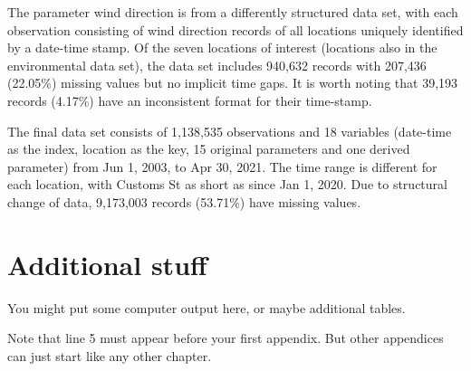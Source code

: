 \documentclass{aucklandthesis}
\begin{document}
The parameter wind direction is from a differently structured data set, with each observation consisting of wind direction records of all locations uniquely identified by a date-time stamp. Of the seven locations of interest (locations also in the environmental data set), the data set includes 940,632 records with 207,436 (22.05\%) missing values but no implicit time gaps. It is worth noting that 39,193 records (4.17\%) have an inconsistent format for their time-stamp.

The final data set consists of 1,138,535 observations and 18 variables (date-time as the index, location as the key, 15 original parameters and one derived parameter) from Jun 1, 2003, to Apr 30, 2021. The time range is different for each location, with Customs St as short as since Jan 1, 2020. Due to structural change of data, 9,173,003 records (53.71\%) have missing values.

\appendix

\hypertarget{additional-stuff}{%
\chapter{Additional stuff}\label{additional-stuff}}

You might put some computer output here, or maybe additional tables.

Note that line 5 must appear before your first appendix. But other appendices can just start like any other chapter.

\printbibliography[heading=bibintoc]
\end{document}

